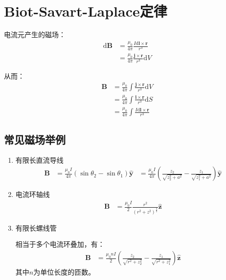 \documentclass[12pt,onecolumn,a4paper]{book}
\numberwithin{table}{subsection}
\numberwithin{equation}{subsection}
\begin{document}
\section{Biot-Savart-Laplace定律}

电流元产生的磁场：
\begin{align}
    \mathrm{d} \mathbf{B} & = \frac{\mu_0}{4\pi} \frac{I \mathrm{d} \mathbf{l} \times \mathbf{r}}{r^3}    \\
                          & = \frac{\mu_0}{4\pi}  \frac{  \mathbf{j} \times \mathbf{r}}{r^3} \mathrm{d} V
\end{align}

从而：
\begin{align}
    \mathbf{B} & = \frac{\mu_0}{4\pi} \int \frac{  \mathbf{j} \times \mathbf{r}}{r^3} \mathrm{d} V \\
               & = \frac{\mu_0}{4\pi} \int \frac{  \mathbf{i} \times \mathbf{r}}{r^3} \mathrm{d} S \\
               & = \frac{\mu_0}{4\pi} \int \frac{I  \mathrm{d}\mathbf{l} \times \mathbf{r}}{r^3}
\end{align}

\subsection{常见磁场举例}

\begin{enumerate}
    \item 有限长直流导线
          \begin{align}
              \mathbf{B} & = \frac{\mu_0 I}{4\pi}(\sin \theta_2 - \sin \theta_1) \hat{\mathbf{y}}
                         & = \frac{\mu_0 I}{4\pi} (\frac{z_2}{\sqrt{z_2^2 + a^2}} - \frac{z_1}{\sqrt{z_1^2 + a^2}}) \hat{\mathbf{y}}
          \end{align}
    \item 电流环轴线
          \begin{align}
              \mathbf{B} & = \frac{\mu_0 I}{2} \frac{r^2}{(r^2+z^2)^\frac{3}{2}}\hat{\mathbf{z}}
          \end{align}
    \item 有限长螺线管

          相当于多个电流环叠加，有：
          \begin{align}
              \mathbf{B} & = \frac{\mu_0 n I}{2} (\frac{z_2}{\sqrt{r^2+z_2^2}}-\frac{z_1}{\sqrt{r^2+z_1^2}})\hat{\mathbf{z}}
          \end{align}
          其中$n$为单位长度的匝数。
\end{enumerate}
\end{document}
